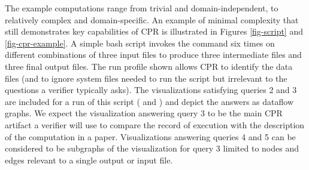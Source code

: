 The example computations range from trivial and domain-independent, to relatively complex and domain-specific. An example of minimal complexity that still demonstrates key capabilities of CPR is illustrated in Figures \ref{fig-script} and \ref{fig-cpr-example}. A simple bash script invokes the  command six times on different combinations of three input files to produce three intermediate files and three final output files. The run profile shown allows CPR to identify the data files (and to ignore system files needed to run the script but irrelevant to the questions a verifier typically asks).  The visualizations satisfying queries 2 and 3 are included for a run of this script ( and ) and depict the answers as dataflow graphs. We expect the visualization answering query 3 to be the main CPR artifact a verifier will use to compare the record of execution with the description of the computation in a paper. Visualizations answering queries 4 and 5 can be considered to be subgraphs of the visualization for query 3 limited to nodes and edges relevant to a single output or input file.

